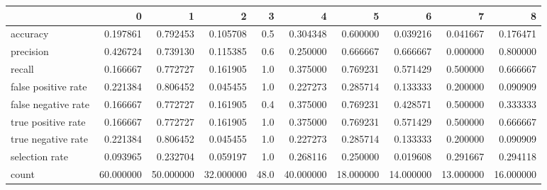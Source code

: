 \begin{tabular}{lrrrrrrrrr}
\toprule
{} &          0 &          1 &          2 &     3 &          4 &          5 &          6 &          7 &          8 \\
\midrule
accuracy            &   0.197861 &   0.792453 &   0.105708 &   0.5 &   0.304348 &   0.600000 &   0.039216 &   0.041667 &   0.176471 \\
precision           &   0.426724 &   0.739130 &   0.115385 &   0.6 &   0.250000 &   0.666667 &   0.666667 &   0.000000 &   0.800000 \\
recall              &   0.166667 &   0.772727 &   0.161905 &   1.0 &   0.375000 &   0.769231 &   0.571429 &   0.500000 &   0.666667 \\
false positive rate &   0.221384 &   0.806452 &   0.045455 &   1.0 &   0.227273 &   0.285714 &   0.133333 &   0.200000 &   0.090909 \\
false negative rate &   0.166667 &   0.772727 &   0.161905 &   0.4 &   0.375000 &   0.769231 &   0.428571 &   0.500000 &   0.333333 \\
true positive rate  &   0.166667 &   0.772727 &   0.161905 &   1.0 &   0.375000 &   0.769231 &   0.571429 &   0.500000 &   0.666667 \\
true negative rate  &   0.221384 &   0.806452 &   0.045455 &   1.0 &   0.227273 &   0.285714 &   0.133333 &   0.200000 &   0.090909 \\
selection rate      &   0.093965 &   0.232704 &   0.059197 &   1.0 &   0.268116 &   0.250000 &   0.019608 &   0.291667 &   0.294118 \\
count               &  60.000000 &  50.000000 &  32.000000 &  48.0 &  40.000000 &  18.000000 &  14.000000 &  13.000000 &  16.000000 \\
\bottomrule
\end{tabular}
